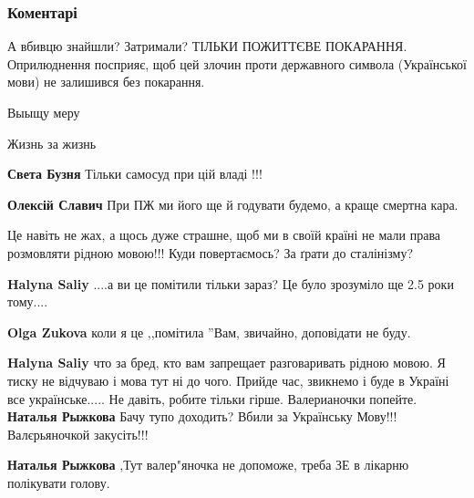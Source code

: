  
 
 
 
 
\subsubsection{Коментарі}

\begin{itemize} %

А вбивцю знайшли? Затримали?
ТІЛЬКИ ПОЖИТТЄВЕ ПОКАРАННЯ.
Оприлюднення посприяє, щоб цей злочин проти державного символа (Української мови) не залишився без покарання.

\begin{itemize} %
Выыщу меру

Жизнь за жизнь

\textbf{Света Бузня} Тільки самосуд при цій владі !!!

\textbf{Олексій Славич} При ПЖ ми його ще й годувати будемо, а краще смертна кара.
\end{itemize} %


Це навіть не жах, а щось дуже страшне, щоб ми в своїй країні не мали права
розмовляти рідною мовою!!! Куди повертаємось? За ґрати до сталінізму?

\begin{itemize} %
\textbf{Halyna Saliy} ....а ви це помітили тільки зараз? Це було зрозуміло ще 2.5 роки тому....

\textbf{Olga Zukova} коли я це ,,помітила ''Вам, звичайно, доповідати не буду.

\textbf{Halyna Saliy} что за бред, кто вам запрещает разговаривать рідною мовою.
Я тиску не відчуваю і мова тут ні до чого. Прийде час, звикнемо і буде в Україні все українське..... Не давіть, робите тільки гірше.
Валерианочки попейте.
\textbf{Наталья Рыжкова} Бачу тупо доходить? Вбили за Українську Мову!!! Валєрьяночкой закусіть!!!

\textbf{Наталья Рыжкова} ,Тут валер"яночка не допоможе, треба ЗЕ в лікарню полікувати голову.


\end{itemize}
\end{itemize}
